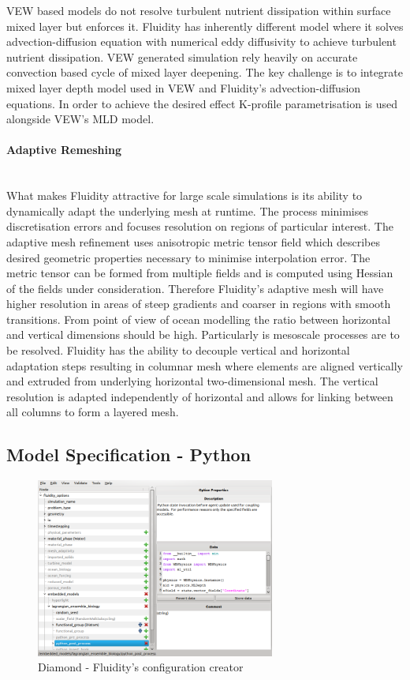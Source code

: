 \documentclass[12pt, a4paper]{report}
\newcommand{\myparagraph}[1]{\paragraph{#1}\mbox{}\\}
\begin{document}
VEW based models do not resolve turbulent nutrient dissipation within
surface mixed layer but enforces it. Fluidity has inherently different
model where it solves advection-diffusion equation with numerical eddy
diffusivity to achieve turbulent nutrient dissipation.
VEW generated simulation rely heavily on accurate convection based
cycle of mixed layer deepening. The key challenge is to integrate
mixed layer depth model used in VEW and Fluidity's advection-diffusion
equations. In order to achieve the desired effect K-profile parametrisation
is used alongside VEW's MLD model.

\myparagraph{Adaptive Remeshing}\label{para:remesh}
What makes Fluidity attractive for large scale simulations is its ability
to dynamically adapt the underlying mesh at runtime. The process minimises
discretisation errors and focuses resolution on regions of particular interest.
The adaptive mesh refinement uses anisotropic metric tensor field which
describes desired geometric properties necessary to minimise interpolation error.
The metric tensor can be formed from multiple fields and is computed using
Hessian of the fields under consideration. Therefore Fluidity's adaptive
mesh will have higher resolution in areas of steep gradients and coarser
in regions with smooth transitions.
From point of view of ocean modelling the ratio between horizontal
and vertical dimensions should be high. Particularly is mesoscale processes
are to be resolved. Fluidity has the ability to decouple vertical
and horizontal adaptation steps resulting in columnar mesh where elements
are aligned vertically and extruded from underlying horizontal two-dimensional mesh.
The vertical resolution is adapted independently of horizontal and allows
for linking between all columns to form a layered mesh.

\subsection{Model Specification - Python}\label{subsec:model-spec-py}

\begin{figure}[H]
  \begin{center}
    \includegraphics[width=0.7\textwidth,natwidth=800,natheight=600]{images/diamond.png}
    \caption{Diamond - Fluidity's configuration creator}
    \label{fig:diamond}
  \end{center}
\end{figure}
\end{document}
